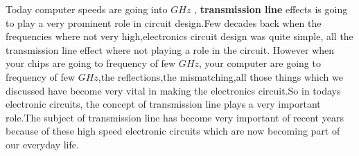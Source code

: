 Today computer speeds are going into $GHz$ , \textbf{transmission line} effects is going to play a very prominent role in circuit design.Few decades back when the frequencies where not very high,electronics circuit design was quite simple, all the transmission line effect where not playing a role in the circuit. However when your chips are going to frequency of few $GHz$, your computer are going to frequency of few $GHz$,the reflections,the mismatching,all those things which we discussed have become very vital in making the electronics circuit.So in todays electronic circuits, the concept of transmission line plays a very  important role.The subject of transmission line has become very important of recent years because of these high speed electronic circuits which are now becoming part of our everyday life. 
